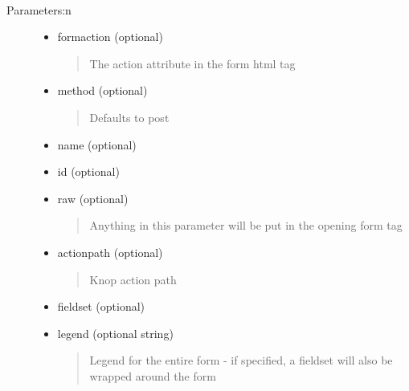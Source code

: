\documentclass[letterpaper,10pt,english]{sphinxmanual}
\begin{document}
\begin{fulllineitems}

\begin{fulllineitems}
~\begin{description}
\item[{Parameters:n}] \leavevmode\begin{itemize}
\item {} 
formaction (optional)
\begin{quote}

The action attribute in the form html tag
\end{quote}

\item {} 
method (optional)
\begin{quote}

Defaults to post
\end{quote}

\item {} 
name (optional)

\item {} 
id (optional)

\item {} 
raw (optional)
\begin{quote}

Anything in this parameter will be put in the opening form tag
\end{quote}

\item {} 
actionpath (optional)
\begin{quote}

Knop action path
\end{quote}

\item {} 
fieldset (optional)

\item {} 
legend (optional string)
\begin{quote}

Legend for the entire form - if specified, a fieldset will also be wrapped around the form
\end{quote}


\end{itemize}
\end{description}
\end{fulllineitems}
\end{fulllineitems}
\end{document}
